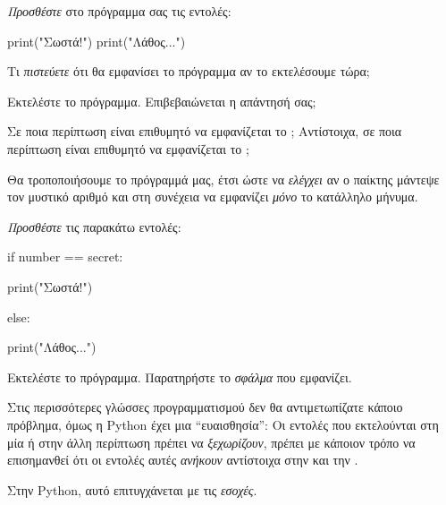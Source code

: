 \documentclass[a4paper,11pt,oneside]{book}
\begin{document}
\begin{step}

\emph{Προσθέστε} στο πρόγραμμα σας τις εντολές: %

\begin{pynew}
print("Σωστά!")
print("Λάθος...")
\end{pynew}

Τι \emph{πιστεύετε} ότι θα εμφανίσει το πρόγραμμα αν το εκτελέσουμε τώρα;

\marginnote[14pt]{\icondiscuss}
\dottedline

Εκτελέστε το πρόγραμμα. Επιβεβαιώνεται η απάντησή σας;

\marginnote[14pt]{\icondiscuss}
\dottedline

Σε ποια περίπτωση είναι επιθυμητό να εμφανίζεται το ; Αντίστοιχα, σε ποια περίπτωση είναι επιθυμητό να εμφανίζεται το ;

\marginnote[14pt]{\icondiscuss}
\dottedline

\dottedline

\end{step}

\begin{step}
Θα τροποποιήσουμε το πρόγραμμά μας, έτσι ώστε να \emph{ελέγχει} αν ο παίκτης μάντεψε τον μυστικό αριθμό και στη συνέχεια να εμφανίζει \emph{μόνο} το κατάλληλο μήνυμα.

\emph{Προσθέστε} τις παρακάτω εντολές:

\begin{pynew}
if number == secret:
\end{pynew}
\begin{pyplain}
print("Σωστά!")
\end{pyplain}
\begin{pynew}
else:
\end{pynew}
\begin{pyplain}
print("Λάθος...")
\end{pyplain}

\marginnote[14pt]{\iconcaution}
Εκτελέστε το πρόγραμμα. Παρατηρήστε το \emph{σφάλμα} που εμφανίζει.

Στις περισσότερες γλώσσες προγραμματισμού δεν θα αντιμετωπίζατε κάποιο πρόβλημα, όμως η Python έχει μια ``ευαισθησία'': Οι εντολές που εκτελούνται στη μία ή στην άλλη περίπτωση πρέπει να \emph{ξεχωρίζουν}, πρέπει με κάποιον τρόπο να επισημανθεί ότι οι εντολές αυτές \emph{ανήκουν} αντίστοιχα στην  και την . 

Στην Python, αυτό επιτυγχάνεται με τις \emph{εσοχές}.
\end{step}
\end{document}
